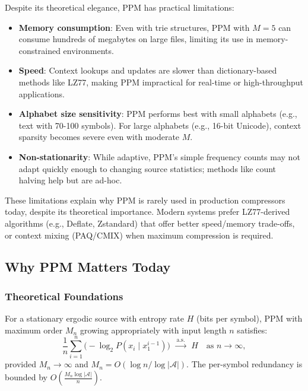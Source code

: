 Despite its theoretical elegance, PPM has practical limitations:

\begin{itemize}
    \item \textbf{Memory consumption}: Even with trie structures, PPM with $M=5$ can 
          consume hundreds of megabytes on large files, limiting its use in memory-constrained 
          environments.
    \item \textbf{Speed}: Context lookups and updates are slower than dictionary-based 
          methods like LZ77, making PPM impractical for real-time or high-throughput applications.
    \item \textbf{Alphabet size sensitivity}: PPM performs best with small alphabets 
          (e.g., text with 70-100 symbols). For large alphabets (e.g., 16-bit Unicode), 
          context sparsity becomes severe even with moderate $M$.
    \item \textbf{Non-stationarity}: While adaptive, PPM's simple frequency counts 
          may not adapt quickly enough to changing source statistics; methods like 
          count halving help but are ad-hoc.
\end{itemize}

These limitations explain why PPM is rarely used in production compressors today, 
despite its theoretical importance. Modern systems prefer LZ77-derived algorithms 
(e.g., Deflate, Zstandard) that offer better speed/memory trade-offs, or context 
mixing (PAQ/CMIX) when maximum compression is required.

\subsection{Why PPM Matters Today}

\subsubsection{Theoretical Foundations}

\begin{theorem}
\label{thm:ppm-optimality}
For a stationary ergodic source with entropy rate $H$ (bits per symbol), PPM with
maximum order $M_n$ growing appropriately with input length $n$ satisfies:
\[
    \frac{1}{n} \sum_{i=1}^{n} \bigl(-\log_2 P(x_i \mid x_1^{i-1})\bigr)
    \;\xrightarrow{\;\text{a.s.}\;}\; H
 \quad \text{as } n \to \infty,
\]
provided $M_n \to \infty$ and $M_n = O(\log n / \log |\mathcal{A}|)$. The
per-symbol redundancy is bounded by $O\!\left(\frac{M_n \log |\mathcal{A}|}{n}\right)$.
\end{theorem}

